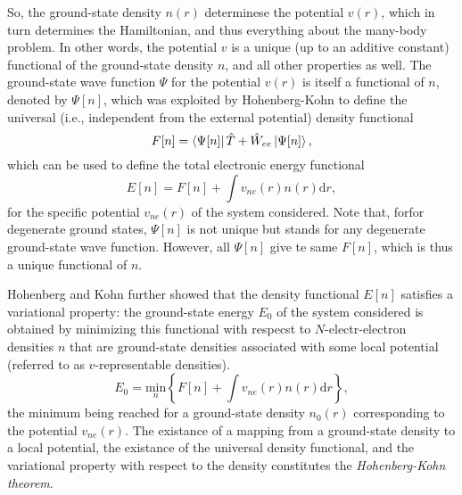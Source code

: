 So, the ground-state density $n(r)$ determinese the potential $v(r)$, which in
turn determines the Hamiltonian, and thus everything about the many-body
problem. In other words, the potential $v$ is a unique (up to an additive
constant) functional of the ground-state density $n$, and all other properties
as well. The ground-state wave function $\Psi$ for the potential $v(r)$ is
itself a functional of $n$, denoted by $\Psi[n]$, which was exploited by
Hohenberg-Kohn to define the universal (i.e., independent from the external
potential) density functional
\begin{equation}
  F[n] = \bra{\Psi[n]}\hat{T} + \hat{W}_{ee}\ket{\Psi[n]},
\end{equation}
which can be used to define the total electronic energy functional
\begin{equation}
  E[n] = F[n] + \int v_{ne}(r)n(r)\mathrm{d}r,
\end{equation}
for the specific potential $v_{ne}(r)$ of the  system considered. Note that,
forfor degenerate ground states, $\Psi[n]$ is not unique but stands for any
degenerate ground-state wave function. However, all $\Psi[n]$ give te same
$F[n]$, which is thus a unique functional of $n$.
\par Hohenberg and Kohn further showed that the density functional $E[n]$
satisfies a variational property: the ground-state energy $E_0$ of the system
considered is obtained by minimizing this functional with respecst to
$N$-electr-electron densities $n$ that are ground-state densities associated
with some local potential (referred to as $v$-representable densities).
\begin{equation}
  E_0 = \underset{n}{\mathrm{min}}\left\{F[n] + \int
  v_{ne}(r)n(r)\mathrm{d}r\right\},
\end{equation}
the minimum being reached for a ground-state density $n_0(r)$ corresponding to
the potential $v_{ne}(r)$.
The existance of a mapping from a ground-state density to a local potential,
the existance of the universal density functional, and the variational property
with respect to the density constitutes the \textit{Hohenberg-Kohn theorem}.
